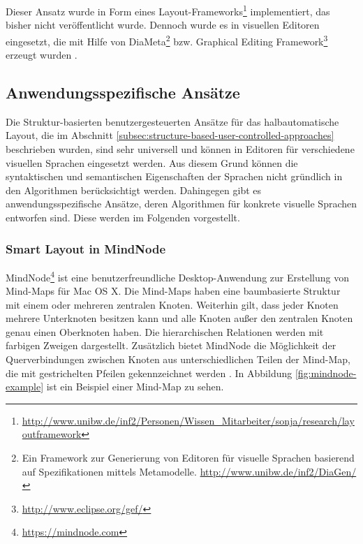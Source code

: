 



Dieser Ansatz wurde in Form eines Layout-Frameworks\footnote{\url{http://www.unibw.de/inf2/Personen/Wissen_Mitarbeiter/sonja/research/layoutframework}} implementiert, das bisher nicht veröffentlicht wurde. Dennoch wurde es in visuellen Editoren eingesetzt, die mit Hilfe von DiaMeta\footnote{Ein Framework zur Generierung von Editoren für visuelle Sprachen basierend auf Spezifikationen mittels Metamodelle. \url{http://www.unibw.de/inf2/DiaGen/}} bzw. Graphical Editing Framework\footnote{\url{http://www.eclipse.org/gef/}} erzeugt wurden \cite{Maier12A-Pattern-based}.

\subsection{Anwendungsspezifische Ansätze}

Die Struktur-basierten benutzergesteuerten Ansätze für das halbautomatische Layout, die im Abschnitt \ref{subsec:structure-based-user-controlled-approaches} beschrieben wurden, sind sehr universell und können in Editoren für verschiedene visuellen Sprachen eingesetzt werden. Aus diesem Grund können die syntaktischen und semantischen Eigenschaften der Sprachen nicht gründlich in den Algorithmen berücksichtigt werden. Dahingegen gibt es anwendungsspezifische Ansätze, deren Algorithmen für konkrete visuelle Sprachen entworfen sind. Diese werden im Folgenden vorgestellt.

\subsubsection{Smart Layout in MindNode}
\label{subsubsec:smart-layout-in-mindnode}

MindNode\footnote{\url{https://mindnode.com}} ist eine benutzerfreundliche Desktop-Anwendung zur Erstellung von Mind-Maps für Mac OS X. Die Mind-Maps haben eine baumbasierte Struktur mit einem oder mehreren zentralen Knoten. Weiterhin gilt, dass jeder Knoten mehrere Unterknoten besitzen kann und alle Knoten außer den zentralen Knoten genau einen Oberknoten haben. Die hierarchischen Relationen werden mit farbigen Zweigen dargestellt. Zusätzlich bietet MindNode die Möglichkeit der Querverbindungen zwischen Knoten aus unterschiedlichen Teilen der Mind-Map, die mit gestrichelten Pfeilen gekennzeichnet werden \cite{14MindNode}. In Abbildung \ref{fig:mindnode-example} ist ein Beispiel einer Mind-Map zu sehen.

